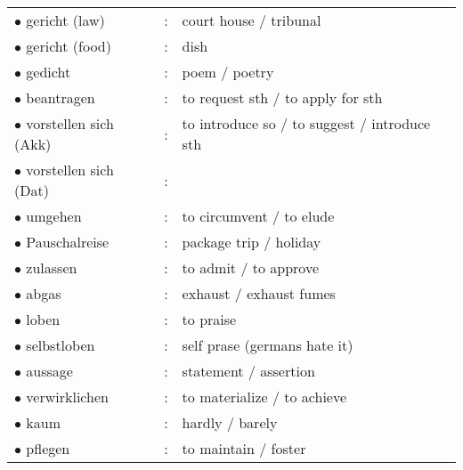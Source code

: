 \documentclass[a4paper,twocolumn,10pt]{article}
\begin{document}
\begin{tabularx}{0.95\linewidth}{lll|X}
\rowcolor{white} $\bullet$ gericht (law)         & : & court house  / tribunal                      & \\
\rowcolor{white} $\bullet$ gericht (food)        & : & dish                                         & \\
\rowcolor{white} $\bullet$ gedicht               & : & poem / poetry                                & \\
\rowcolor{white} $\bullet$ beantragen            & : & to request sth / to apply for sth            & \\
\rowcolor{white} $\bullet$ vorstellen sich (Akk) & : & to introduce so / to suggest / introduce sth & \\
\rowcolor{white} $\bullet$ vorstellen sich (Dat) & : &                                              & \\
\rowcolor{white} $\bullet$ umgehen               & : & to circumvent / to elude                     & \\
\rowcolor{white} $\bullet$ Pauschalreise         & : & package trip / holiday                       & \\
\rowcolor{white} $\bullet$ zulassen              & : & to admit / to approve                        & \\
\rowcolor{white} $\bullet$ abgas                 & : & exhaust / exhaust fumes                      & \\
\rowcolor{white} $\bullet$ loben                 & : & to praise                                    & \\
\rowcolor{white} $\bullet$ selbstloben           & : & self prase (germans hate it)                 & \\
\rowcolor{white} $\bullet$ aussage               & : & statement / assertion                        & \\
\rowcolor{white} $\bullet$ verwirklichen         & : & to materialize / to achieve                  & \\
\rowcolor{white} $\bullet$ kaum                  & : & hardly / barely                              & \\
\rowcolor{white} $\bullet$ pflegen               & : & to maintain / foster                         & \\


\end{tabularx}
\newline

\end{document}
